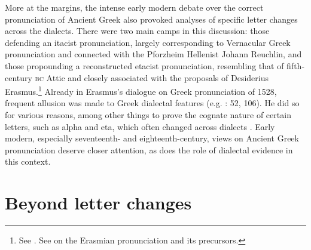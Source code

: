 More at the margins, the intense early modern debate over the correct pronunciation of Ancient Greek also provoked analyses of specific letter changes across the dialects. There were two main camps in this discussion: those defending an itacist pronunciation, largely corresponding to Vernacular Greek pronunciation and connected with the Pforzheim Hellenist Johann Reuchlin, and those propounding a reconstructed etacist pronunciation, resembling that of fifth-century \textsc{bc} Attic and closely associated with the proposals of Desiderius Erasmus.\footnote{See \citet[\textsc{ii.}130]{Sandys1908}. See \citet{Bywater1908} on the Erasmian pronunciation and its precursors.} Already in Erasmus’s dialogue on Greek pronunciation of 1528, frequent allusion was made to Greek dialectal features (e.g. \citealt{Erasmus1528}: 52, 106). He did so for various reasons, among other things to prove the cognate nature of certain letters, such as alpha and eta, which often changed across dialects \citep[62]{Erasmus1528}. Early modern, especially seventeenth- and eighteenth-century, views on Ancient Greek pronunciation deserve closer attention, as does the role of dialectal evidence in this context.

\section{Beyond letter changes}\label{sec:6.3}

